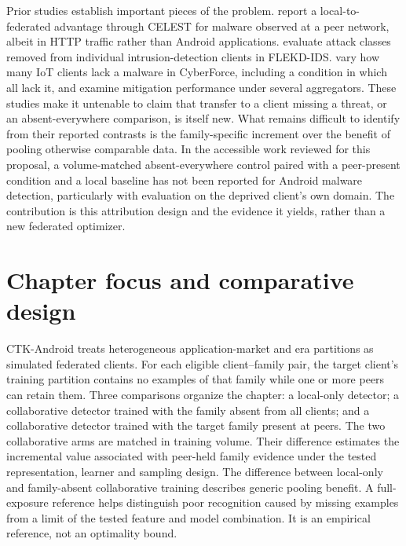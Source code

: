 \documentclass[11pt,a4paper]{article}
\begin{document}
Prior studies establish important pieces of the problem. \citet{ongun2022} report a local-to-federated advantage through CELEST for malware observed at a peer network, albeit in HTTP traffic rather than Android applications. \citet{shen2024} evaluate attack classes removed from individual intrusion-detection clients in FLEKD-IDS. \citet{feng2025} vary how many IoT clients lack a malware in CyberForce, including a condition in which all lack it, and examine mitigation performance under several aggregators. These studies make it untenable to claim that transfer to a client missing a threat, or an absent-everywhere comparison, is itself new. What remains difficult to identify from their reported contrasts is the family-specific increment over the benefit of pooling otherwise comparable data. In the accessible work reviewed for this proposal, a volume-matched absent-everywhere control paired with a peer-present condition and a local baseline has not been reported for Android malware detection, particularly with evaluation on the deprived client's own domain. The contribution is this attribution design and the evidence it yields, rather than a new federated optimizer.

\section*{Chapter focus and comparative design}

CTK-Android treats heterogeneous application-market and era partitions as simulated federated clients. For each eligible client--family pair, the target client's training partition contains no examples of that family while one or more peers can retain them. Three comparisons organize the chapter: a local-only detector; a collaborative detector trained with the family absent from all clients; and a collaborative detector trained with the target family present at peers. The two collaborative arms are matched in training volume. Their difference estimates the incremental value associated with peer-held family evidence under the tested representation, learner and sampling design. The difference between local-only and family-absent collaborative training describes generic pooling benefit. A full-exposure reference helps distinguish poor recognition caused by missing examples from a limit of the tested feature and model combination. It is an empirical reference, not an optimality bound.
\end{document}
